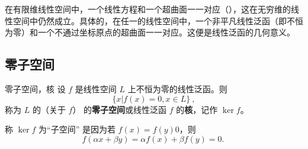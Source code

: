 
在有限维线性空间中，一个线性方程和一个超曲面一一对应（），这在无穷维的线性空间中仍然成立。具体的，在任一的线性空间中，一个非平凡线性泛函（即不恒为零）和一个不通过坐标原点的超曲面一一对应。这便是线性泛函的几何意义。

\subsection{零子空间}
\begin{definition}{零子空间，核}
设 $f$ 是线性空间 $L$ 上不恒为零的线性泛函。则
\begin{equation}
\{x|f(x)=0,x\in L\}~,
\end{equation}
称为 $L$ 的（关于 $f$） 的\textbf{零子空间}或线性泛函 $f$ 的\textbf{核}，记作 $\ker f$。
\end{definition}

称 $\ker f$ 为“子空间” 是因为若 $f(x)=f(y)0$，则 
\begin{equation}
f(\alpha x+\beta y)=\alpha f(x)+\beta f(y)=0.~
\end{equation}















